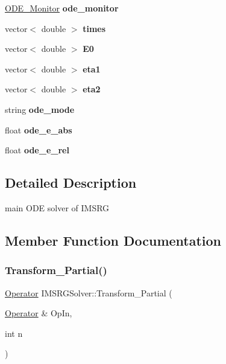 \begin{DoxyCompactItemize}
\hyperlink{classIMSRGSolver_1_1ODE__Monitor}{O\+D\+E\+\_\+\+Monitor} {\bfseries ode\+\_\+monitor}
\item 
\mbox{\label{classIMSRGSolver_aaa21ad87df530129d0a9549ff7fb5c5e}} 
vector$<$ double $>$ {\bfseries times}
\item 
\mbox{\label{classIMSRGSolver_a50bceae55508151ebed72d64ca2e40a5}} 
vector$<$ double $>$ {\bfseries E0}
\item 
\mbox{\label{classIMSRGSolver_aafa4583ba277422783257ba7532d5509}} 
vector$<$ double $>$ {\bfseries eta1}
\item 
\mbox{\label{classIMSRGSolver_a8aa5efc027730bbdf6987fd3d8aba693}} 
vector$<$ double $>$ {\bfseries eta2}
\item 
\mbox{\label{classIMSRGSolver_a78b042401ae2c27a6a69fea001b03c1a}} 
string {\bfseries ode\+\_\+mode}
\item 
\mbox{\label{classIMSRGSolver_abebbf4eb6775b4c12c88323cab921b9c}} 
float {\bfseries ode\+\_\+e\+\_\+abs}
\item 
\mbox{\label{classIMSRGSolver_a5051af51a8c66b25e21620725bb2b161}} 
float {\bfseries ode\+\_\+e\+\_\+rel}
\end{DoxyCompactItemize}


\subsection{Detailed Description}
main O\+DE solver of I\+M\+S\+RG 

\subsection{Member Function Documentation}
\mbox{\label{classIMSRGSolver_a7313cfb167c0daba014ea4b13f17a7e5}} 
\subsubsection{\texorpdfstring{Transform\+\_\+\+Partial()}{Transform\_Partial()}}
{\footnotesize\ttfamily \hyperlink{classOperator}{Operator} I\+M\+S\+R\+G\+Solver\+::\+Transform\+\_\+\+Partial (\begin{DoxyParamCaption}\item[{\hyperlink{classOperator}{Operator} \&}]{Op\+In,  }\item[{int}]{n }\end{DoxyParamCaption})}

